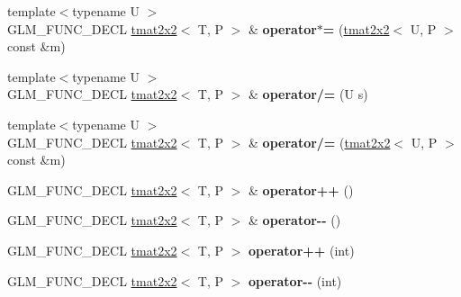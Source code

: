\begin{DoxyCompactItemize}
\item 
\hypertarget{structglm_1_1tmat2x2_a22ec14725c380635ddec8d3c9c856bcc}{{\footnotesize template$<$typename U $>$ }\\G\-L\-M\-\_\-\-F\-U\-N\-C\-\_\-\-D\-E\-C\-L \hyperlink{structglm_1_1tmat2x2}{tmat2x2}$<$ T, P $>$ \& {\bfseries operator$\ast$=} (\hyperlink{structglm_1_1tmat2x2}{tmat2x2}$<$ U, P $>$ const \&m)}\label{structglm_1_1tmat2x2_a22ec14725c380635ddec8d3c9c856bcc}

\item 
\hypertarget{structglm_1_1tmat2x2_a9004d0d6f8a7e19c0d592a0f1f9aed65}{{\footnotesize template$<$typename U $>$ }\\G\-L\-M\-\_\-\-F\-U\-N\-C\-\_\-\-D\-E\-C\-L \hyperlink{structglm_1_1tmat2x2}{tmat2x2}$<$ T, P $>$ \& {\bfseries operator/=} (U s)}\label{structglm_1_1tmat2x2_a9004d0d6f8a7e19c0d592a0f1f9aed65}

\item 
\hypertarget{structglm_1_1tmat2x2_a2aa165291397c48680be24491256870e}{{\footnotesize template$<$typename U $>$ }\\G\-L\-M\-\_\-\-F\-U\-N\-C\-\_\-\-D\-E\-C\-L \hyperlink{structglm_1_1tmat2x2}{tmat2x2}$<$ T, P $>$ \& {\bfseries operator/=} (\hyperlink{structglm_1_1tmat2x2}{tmat2x2}$<$ U, P $>$ const \&m)}\label{structglm_1_1tmat2x2_a2aa165291397c48680be24491256870e}

\item 
\hypertarget{structglm_1_1tmat2x2_ab8b955f682c80d5c4fe972b9e806310f}{G\-L\-M\-\_\-\-F\-U\-N\-C\-\_\-\-D\-E\-C\-L \hyperlink{structglm_1_1tmat2x2}{tmat2x2}$<$ T, P $>$ \& {\bfseries operator++} ()}\label{structglm_1_1tmat2x2_ab8b955f682c80d5c4fe972b9e806310f}

\item 
\hypertarget{structglm_1_1tmat2x2_a0d31730ea120eeb9cc3f6aa0087ca111}{G\-L\-M\-\_\-\-F\-U\-N\-C\-\_\-\-D\-E\-C\-L \hyperlink{structglm_1_1tmat2x2}{tmat2x2}$<$ T, P $>$ \& {\bfseries operator-\/-\/} ()}\label{structglm_1_1tmat2x2_a0d31730ea120eeb9cc3f6aa0087ca111}

\item 
\hypertarget{structglm_1_1tmat2x2_a091398a35a0770ab4cb7b86af4ff6ee7}{G\-L\-M\-\_\-\-F\-U\-N\-C\-\_\-\-D\-E\-C\-L \hyperlink{structglm_1_1tmat2x2}{tmat2x2}$<$ T, P $>$ {\bfseries operator++} (int)}\label{structglm_1_1tmat2x2_a091398a35a0770ab4cb7b86af4ff6ee7}

\item 
\hypertarget{structglm_1_1tmat2x2_a8046c4a0a3d7f95a70bdd01ad5d7782d}{G\-L\-M\-\_\-\-F\-U\-N\-C\-\_\-\-D\-E\-C\-L \hyperlink{structglm_1_1tmat2x2}{tmat2x2}$<$ T, P $>$ {\bfseries operator-\/-\/} (int)}\label{structglm_1_1tmat2x2_a8046c4a0a3d7f95a70bdd01ad5d7782d}

\end{DoxyCompactItemize}
